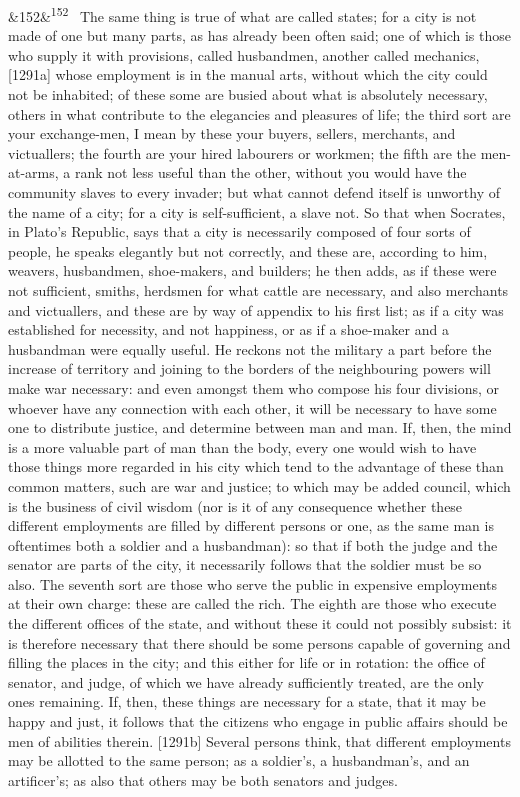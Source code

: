 \documentclass[12pt]{article}
\newcommand{\para}[1][]{\par\noindent\ifx&#1&\else\textsuperscript{\footnotesize #1}~\fi}
\begin{document}
\para[152] The same thing is true of what are called states; for a city is not made of one but many parts, as has already been often said; one of which is those who supply it with provisions, called husbandmen, another called mechanics, [1291a] whose employment is in the manual arts, without which the city could not be inhabited; of these some are busied about what is absolutely necessary, others in what contribute to the elegancies and pleasures of life; the third sort are your exchange-men, I mean by these your buyers, sellers, merchants, and victuallers; the fourth are your hired labourers or workmen; the fifth are the men-at-arms, a rank not less useful than the other, without you would have the community slaves to every invader; but what cannot defend itself is unworthy of the name of a city; for a city is self-sufficient, a slave not. So that when Socrates, in Plato's Republic, says that a city is necessarily composed of four sorts of people, he speaks elegantly but not correctly, and these are, according to him, weavers, husbandmen, shoe-makers, and builders; he then adds, as if these were not sufficient, smiths, herdsmen for what cattle are necessary, and also merchants and victuallers, and these are by way of appendix to his first list; as if a city was established for necessity, and not happiness, or as if a shoe-maker and a husbandman were equally useful. He reckons not the military a part before the increase of territory and joining to the borders of the neighbouring powers will make war necessary: and even amongst them who compose his four divisions, or whoever have any connection with each other, it will be necessary to have some one to distribute justice, and determine between man and man. If, then, the mind is a more valuable part of man than the body, every one would wish to have those things more regarded in his city which tend to the advantage of these than common matters, such are war and justice; to which may be added council, which is the business of civil wisdom (nor is it of any consequence whether these different employments are filled by different persons or one, as the same man is oftentimes both a soldier and a husbandman): so that if both the judge and the senator are parts of the city, it necessarily follows that the soldier must be so also. The seventh sort are those who serve the public in expensive employments at their own charge: these are called the rich. The eighth are those who execute the different offices of the state, and without these it could not possibly subsist: it is therefore necessary that there should be some persons capable of governing and filling the places in the city; and this either for life or in rotation: the office of senator, and judge, of which we have already sufficiently treated, are the only ones remaining. If, then, these things are necessary for a state, that it may be happy and just, it follows that the citizens who engage in public affairs should be men of abilities therein. [1291b] Several persons think, that different employments may be allotted to the same person; as a soldier's, a husbandman's, and an artificer's; as also that others may be both senators and judges.
\end{document}

